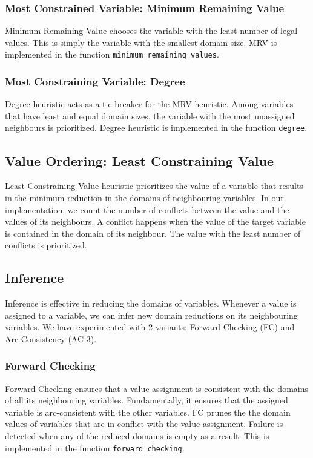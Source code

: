 \documentclass[runningheads]{llncs}
\begin{document}
\subsubsection{Most Constrained Variable: Minimum Remaining Value} 

Minimum Remaining Value chooses the variable with the least number of legal values. This is simply the variable with the smallest domain size. MRV is implemented in the function \verb`minimum_remaining_values`.

\subsubsection{Most Constraining Variable: Degree}

Degree heuristic acts as a tie-breaker for the MRV heuristic. Among variables that have least and equal domain sizes, the variable with the most unassigned neighbours is prioritized. Degree heuristic is implemented in the function \verb`degree`. 

\subsection{Value Ordering: Least Constraining Value}

Least Constraining Value heuristic prioritizes the value of a variable that results in the minimum reduction in the domains of neighbouring variables. In our implementation, we count the number of conflicts between the value and the values of its neighbours. A conflict happens when the value of the target variable is contained in the domain of its neighbour. The value with the least number of conflicts is prioritized. 


\subsection{Inference}

Inference is effective in reducing the domains of variables. Whenever a value is assigned to a variable, we can infer new domain reductions on its neighbouring variables. We have experimented with 2 variants: Forward Checking (FC) and Arc Consistency (AC-3). 


\subsubsection{Forward Checking}

Forward Checking ensures that a value assignment is consistent with the domains of all its neighbouring variables. Fundamentally, it ensures that the assigned variable is arc-consistent with the other variables. FC prunes the the domain values of variables that are in conflict with the value assignment. Failure is detected when any of the reduced domains is empty as a result. This is implemented in the function \verb`forward_checking`.
\end{document}
